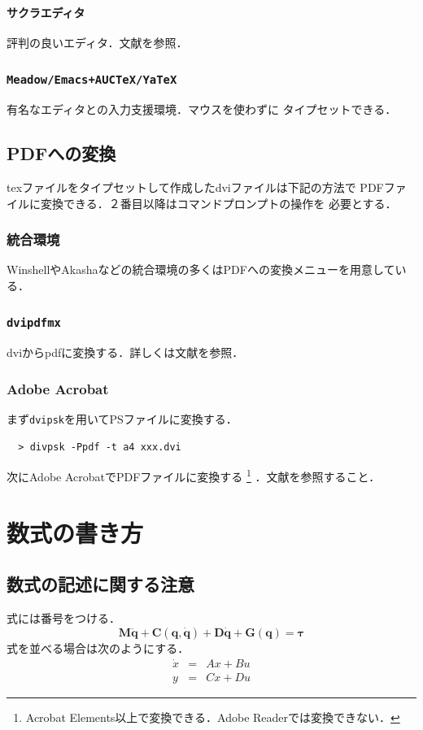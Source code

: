 \documentclass[onecolumn]{jsarticle}
\begin{document}
\subsubsection{\texttt{サクラエディタ}}
評判の良いエディタ．文献\cite{TeXWiki}を参照．
\subsubsection{\texttt{Meadow/Emacs+AUCTeX/YaTeX}}
有名なエディタと\LaTeXe の入力支援環境．マウスを使わずに
タイプセットできる．

\subsection{PDFへの変換}
\label{dvipdf}
texファイルをタイプセットして作成したdviファイルは下記の方法で
PDFファイルに変換できる．２番目以降はコマンドプロンプトの操作を
必要とする．
\subsubsection{統合環境}
WinshellやAkashaなどの統合環境の多くはPDFへの変換メニューを用意している．
\subsubsection{\texttt{dvipdfmx}}
dviからpdfに変換する．詳しくは文献\cite{TeXWiki}を参照．
\subsubsection{Adobe Acrobat}
まず\texttt{dvipsk}を用いてPSファイルに変換する．
\begin{verbatim}
  > divpsk -Ppdf -t a4 xxx.dvi
\end{verbatim}
次にAdobe AcrobatでPDFファイルに変換する
\footnote{Acrobat Elements以上で変換できる．Adobe Readerでは変換できない．}
．文献\cite{TeXWiki}を参照すること．


\section{数式の書き方}

\subsection{数式の記述に関する注意}
式には番号をつける．
\begin{equation}
  \bm{M} \ddot{\bm{q}} + \bm{C}(\bm{q},\dot{\bm{q}}) 
  + \bm{D} \dot{\bm{q}} + \bm{G}(\bm{q}) = \bm{\tau}
  \label{eqn:manipulatoreqs}
\end{equation}
式を並べる場合は次のようにする．
\begin{eqnarray}
  \dot x & = & A x + B u \\
  y & = & C x + D u
\end{eqnarray}
\end{document}
